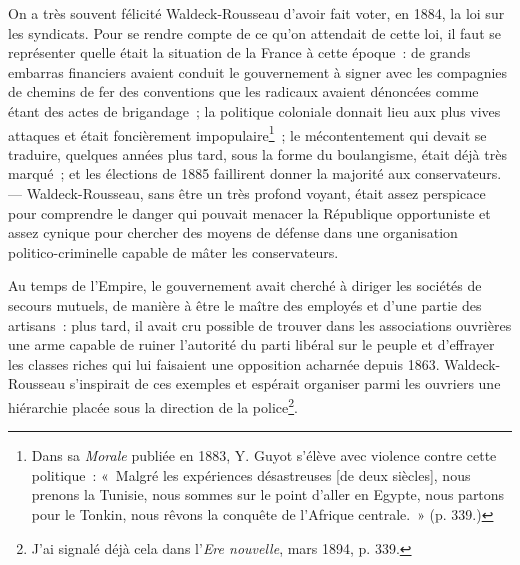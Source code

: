 \documentclass[french,twoside]{book} %
\begin{document}
\noindent On a très souvent félicité Waldeck-Rousseau d’avoir fait voter, en 1884, la loi sur les syndicats. Pour se rendre compte de ce qu’on attendait de cette loi, il faut se représenter quelle était la situation de la France à cette époque : de grands embarras financiers avaient conduit le gouvernement à signer avec les compagnies de chemins de fer des conventions que les radicaux avaient dénoncées comme étant des actes de brigandage ; la politique coloniale donnait lieu aux plus vives attaques et était foncièrement impopulaire\footnote{ \noindent Dans sa \emph{Morale} publiée en 1883, Y. Guyot s’élève avec violence contre cette politique : « Malgré les expériences désastreuses [de deux siècles], nous prenons la Tunisie, nous sommes sur le point d’aller en Egypte, nous partons pour le Tonkin, nous rêvons la conquête de l’Afrique centrale. » (p. 339.)
 } ; le mécontentement qui devait se traduire, quelques années plus tard, sous la forme du boulangisme, était déjà très marqué ; et les élections de 1885 faillirent donner la majorité aux conservateurs. — Waldeck-Rousseau, sans être un très profond voyant, était assez perspicace pour comprendre le danger  qui pouvait menacer la République opportuniste et assez cynique pour chercher des moyens de défense dans une organisation politico-criminelle capable de mâter les conservateurs.\par
Au temps de l’Empire, le gouvernement avait cherché à diriger les sociétés de secours mutuels, de manière à être le maître des employés et d’une partie des artisans : plus tard, il avait cru possible de trouver dans les associations ouvrières une arme capable de ruiner l’autorité du parti libéral sur le peuple et d’effrayer les classes riches qui lui faisaient une opposition acharnée depuis 1863. Waldeck-Rousseau s’inspirait de ces exemples et espérait organiser parmi les ouvriers une hiérarchie placée sous la direction de la police\footnote{ \noindent J’ai signalé déjà cela dans l’\emph{Ere nouvelle}, mars 1894, p. 339.
 }.\par
\end{document}
